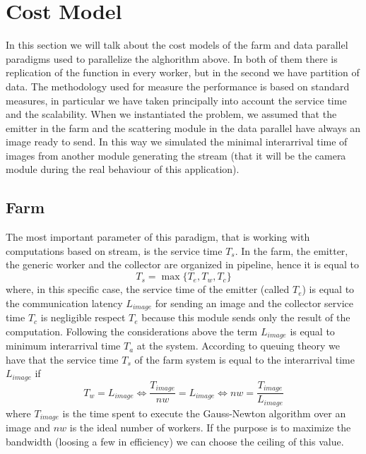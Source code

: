 \section{Cost Model}

In this section we will talk about the cost models of the farm and data parallel paradigms used to parallelize the alghorithm above. In both of them there is replication of the function in every worker, but in the second we have partition of data. The methodology used for measure the performance is based on standard measures, in particular we have taken principally into account the service time and the scalability. When we instantiated the problem, we assumed that the emitter in the farm and the scattering module in the data parallel have always an image ready to send. In this way we simulated the minimal interarrival time of images from another module generating the stream (that it will be the camera module during the real behaviour of this application).

\subsection{Farm}

The most important parameter of this paradigm, that is working with computations based on stream, is the service time $T_{s}$. In the farm, the emitter, the generic worker and the collector are organized in pipeline, hence it is equal to
\[
T_{s} = \max \lbrace T_{e}, T_{w}, T_{c}\rbrace
\]
where, in this specific case, the service time of the emitter (called $T_{e}$) is equal to the communication latency $L_{image}$ for sending an image and the collector service time $T_{c}$ is negligible respect $T_{e}$ because this module sends only the result of the computation. Following the considerations above the term $L_{image}$ is equal to minimum interarrival time $T_{a}$ at the system. According to queuing theory we have that the service time $T_{s}$ of the farm system is equal to the interarrival time $L_{image}$ if
\[
T_{w} = L_{image} \Leftrightarrow \frac{T_{image}}{nw} = L_{image} \Leftrightarrow nw = \frac{T_{image}}{L_{image}} 
\]
where $T_{image}$ is the time spent to execute the Gauss-Newton algorithm over an image and $nw$ is the ideal number of workers. If the purpose is to maximize the bandwidth (loosing a few in efficiency) we can choose the ceiling of this value.

